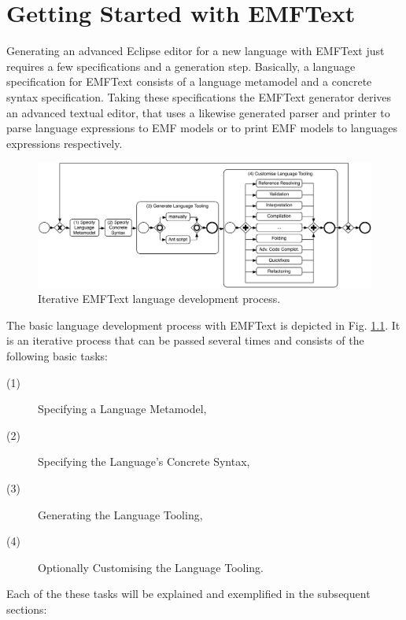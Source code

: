 \chapter{Getting Started with EMFText}

	Generating an advanced Eclipse editor for a new language with EMFText just
	requires a few specifications and a generation step. 
	Basically, a language specification for EMFText consists of a language
	metamodel and a concrete syntax specification. Taking these specifications the
	EMFText generator derives an advanced textual editor, that uses a likewise
	generated parser and printer to parse language expressions to EMF models or to print EMF models to
	languages expressions respectively. 
	
	\begin{figure}[ht]
	\centering
		\includegraphics[scale=0.5]{figures/process}
	\caption{Iterative EMFText language development process.}
	\label{fig:process}
	\end{figure}
	
	\noindent The basic language development process with EMFText is depicted in
	Fig. \ref{fig:process}. It is an iterative process that can be passed several
	times and consists of the following basic tasks:
	\begin{description}
	  \item[(1)] Specifying a Language Metamodel,
	  \item[(2)] Specifying the Language's Concrete Syntax,
	  \item[(3)] Generating the Language Tooling,
	  \item[(4)] Optionally Customising the Language Tooling.
	\end{description}
	
	
	
	Each of the these tasks
	will be explained and exemplified in the subsequent sections:
	
